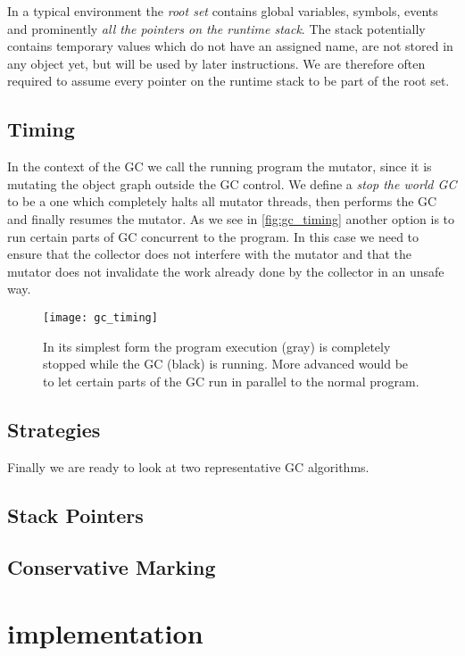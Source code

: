 In a typical environment the \emph{root set} contains \eg global variables, symbols, events and prominently \emph{all the pointers on the runtime stack}. The stack potentially contains temporary values which do not have an assigned name, are not stored in any object yet, but will be used by later instructions. We are therefore often required to assume every pointer on the runtime stack to be part of the root set.

\subsection{Timing}

In the context of the GC we call the running program the mutator, since it is mutating the object graph outside the GC control. We define a \emph{stop the world GC} to be a one which completely halts all mutator threads, then performs the GC and finally resumes the mutator. As we see in \autoref{fig:gc_timing} another option is to run certain parts of GC concurrent to the program. In this case we need to ensure that the collector does not interfere with the mutator and that the mutator does not invalidate the work already done by the collector in an unsafe way.

\begin{figure}[h]
\centering
\texttt{[image: gc\_timing]}
\caption{In its simplest form the program execution (gray) is completely stopped while the GC (black) is running. More advanced would be to let certain parts of the GC run in parallel to the normal program.}
\label{fig:gc_timing}
\end{figure}

\subsection{Strategies}

Finally we are ready to look at two representative GC algorithms.

\subsection{Stack Pointers}
\subsection{Conservative Marking}

\section{\Rift implementation}
